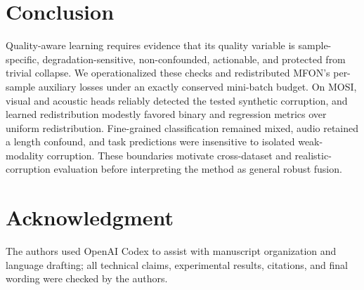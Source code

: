 \documentclass{article}
\begin{document}
\section{Conclusion}

Quality-aware learning requires evidence that its quality variable is sample-specific, degradation-sensitive, non-confounded, actionable, and protected from trivial collapse. We operationalized these checks and redistributed MFON's per-sample auxiliary losses under an exactly conserved mini-batch budget. On MOSI, visual and acoustic heads reliably detected the tested synthetic corruption, and learned redistribution modestly favored binary and regression metrics over uniform redistribution. Fine-grained classification remained mixed, audio retained a length confound, and task predictions were insensitive to isolated weak-modality corruption. These boundaries motivate cross-dataset and realistic-corruption evaluation before interpreting the method as general robust fusion.

\section*{Acknowledgment}
The authors used OpenAI Codex to assist with manuscript organization and language drafting; all technical claims, experimental results, citations, and final wording were checked by the authors.



\end{document}
